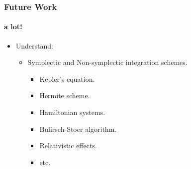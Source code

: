 \begin{frame}
    \frametitle{Future Work}
    \framesubtitle{a lot!}
    \begin{itemize}
        \item Understand:
        \begin{itemize}
            \item Symplectic and Non-symplectic integration schemes.
            \begin{itemize}
                \item Kepler's equation.
                \item Hermite scheme.
                \item Hamiltonian systems.
                \item Bulirsch-Stoer algorithm.
                \item Relativistic effects.
                \item etc.
            \end{itemize}
        \end{itemize}
    \end{itemize}
\end{frame}
